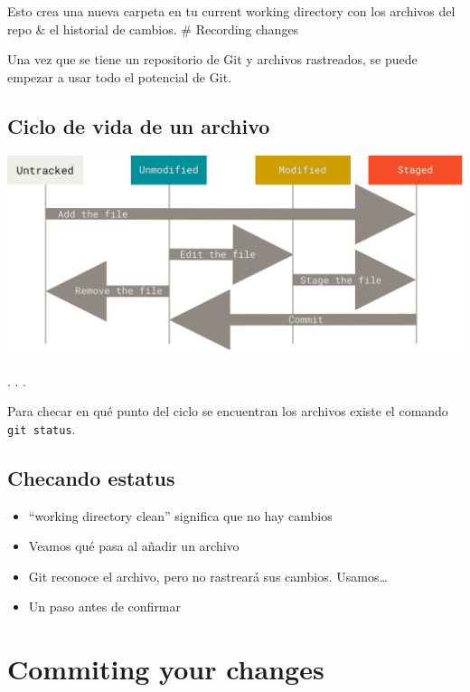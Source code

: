 Esto crea una nueva carpeta en tu current working directory con los
archivos del repo \& el historial de cambios. \# Recording changes

Una vez que se tiene un repositorio de Git y archivos rastreados, se
puede empezar a usar todo el potencial de Git.

\subsection{Ciclo de vida de un archivo}

\includegraphics{figs/lifecycle.png}

. . .

Para checar en qué punto del ciclo se encuentran los archivos existe el
comando \passthrough{\lstinline!git status!}.

\subsection{Checando estatus}

\begin{itemize}
\item
  ``working directory clean'' significa que no hay cambios
\item
  Veamos qué pasa al añadir un archivo
\item
  Git reconoce el archivo, pero no rastreará sus cambios. Usamos\ldots{}
\item
  Un paso antes de confirmar
\end{itemize}

\section{Commiting your changes}

